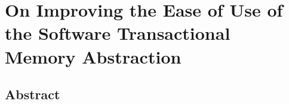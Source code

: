 \documentclass[11pt]{book}
\begin{document}








\printindex






% 
\newpage
\thispagestyle{empty}
\mbox{}
\newpage


\thispagestyle{empty}
\pagestyle{empty}

\section*{On Improving the Ease of Use of the Software Transactional Memory Abstraction}
\subsection*{Abstract}
\end{document}
